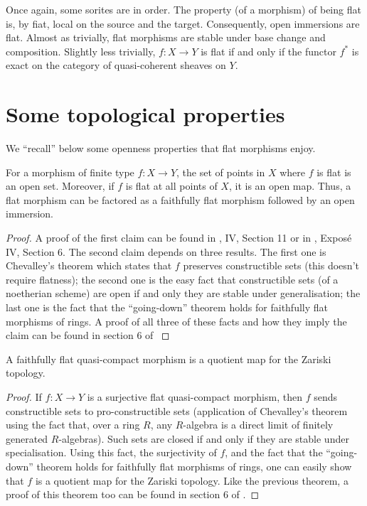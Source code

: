 \noindent
Once again, some sorites are in order. The property (of a morphism) of being
flat is, by fiat, local on the source and the target. Consequently, open
immersions are flat. Almost as trivially, flat morphisms are stable under
base change and composition. Slightly less trivially, $f:X \to Y$ is flat if
and only if the functor $f^*$ is exact on the category of quasi-coherent
sheaves on $Y$. 

\section{Some topological properties}
\label{section-topological-flat}

\noindent
We ``recall'' below some openness properties that flat morphisms enjoy.

\begin{theorem}
\label{theorem-flat-open}
For a morphism of finite type $f:X \to Y$, the set of points in $X$ where $f$
is flat is an open set. Moreover, if $f$ is flat at all points of $X$, it is
an open map. Thus, a flat morphism can be factored as a faithfully flat
morphism followed by an open immersion.
\end{theorem}

\begin{proof}
A proof of the first claim can be found in \cite{EGA}, IV, Section 11 or in
\cite{SGA1}, Expos\'e IV, Section 6. The second claim depends on three
results. The first one is Chevalley's theorem which states that $f$ preserves
constructible sets (this doesn't require flatness); the second one is the
easy fact that constructible sets (of a noetherian scheme) are open if and
only they are stable under generalisation; the last one is the fact that the
``going-down'' theorem holds for faithfully flat morphisms of rings. A proof
of all three of these facts and how they imply the claim can be found in
section 6 of \cite{MatCA} 
\end{proof}

\begin{theorem}
\label{theorem-flat-is-quotient}
A faithfully flat quasi-compact morphism is a quotient map for
the Zariski topology.
\end{theorem}

\begin{proof}
If $f:X \to Y$ is a surjective flat quasi-compact morphism, then $f$ sends
constructible sets to pro-constructible sets (application of Chevalley's
theorem using the fact that, over a ring $R$, any $R$-algebra is a direct
limit of finitely generated $R$-algebras). Such sets are closed if and only
if they are stable under specialisation. Using this fact, the surjectivity
of $f$, and the fact that the ``going-down'' theorem holds for faithfully
flat morphisms of rings, one can easily show that $f$ is a quotient map for
the Zariski topology. Like the previous theorem, a proof of this theorem too
can be found in section 6 of \cite{MatCA}.
\end{proof}

